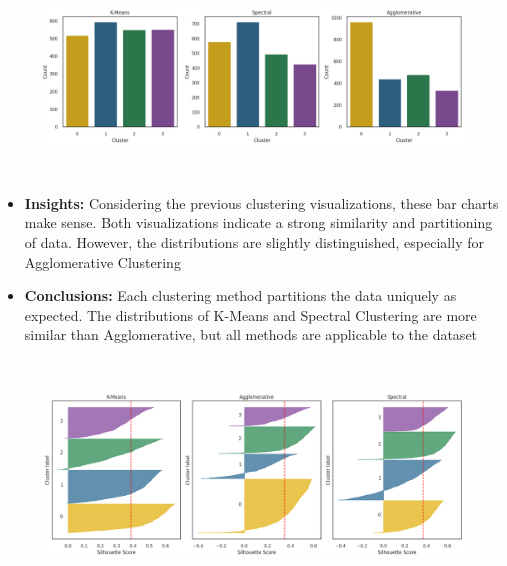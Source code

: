 \documentclass[11pt]{article}
\begin{document}
\vspace{1\baselineskip}
\begin{figure}[H]
\raggedright
\includegraphics[width=15.92cm,height=5.19cm]{./images/image29.png}
\end{figure}


\begin{itemize}
	\item \textbf{Insights:} Considering the previous clustering visualizations, these bar charts make sense. Both visualizations indicate a strong similarity and partitioning of data. However, the distributions are slightly distinguished, especially for Agglomerative Clustering

\end{itemize}
\vspace{1\baselineskip}
\begin{itemize}
	\item \textbf{Conclusions:} Each clustering method partitions the data uniquely as expected. The distributions of K-Means and Spectral Clustering are more similar than Agglomerative, but all methods are applicable to the dataset

\end{itemize}
\vspace{1\baselineskip}
\begin{figure}[H]
\centering
\includegraphics[width=15.92cm,height=6.17cm]{./images/image21.png}
\end{figure}
\end{document}
